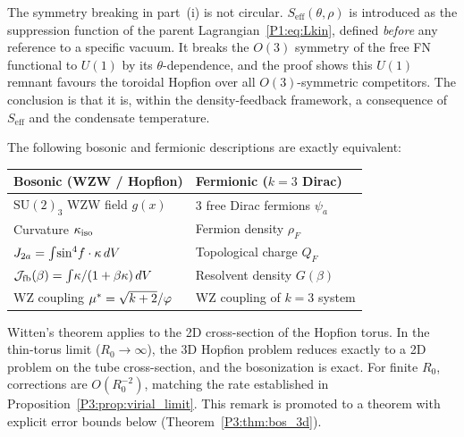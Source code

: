 \begin{remark}
\label{P1:rem:symmetry_breaking_noncircular}
The symmetry breaking in part~(i) is not circular.
$S_{\mathrm{eff}}(\theta,\rho)$ is introduced as the suppression
function of the parent Lagrangian~\eqref{P1:eq:Lkin}, defined
\emph{before} any reference to a specific vacuum.  It breaks the
$O(3)$ symmetry of the free FN functional to $U(1)$ by its $\theta$-dependence,
and the proof shows this $U(1)$ remnant favours the toroidal Hopfion
over all $O(3)$-symmetric competitors.  The conclusion is that it is, within the
density-feedback framework, a consequence of $S_{\mathrm{eff}}$
and the condensate temperature.
\end{remark}

\begin{theorem}[Witten bosonization dictionary, $k=3$]
\label{P3:thm:bosonization}
The following bosonic and fermionic descriptions are exactly equivalent:
\begin{center}
\begin{tabular}{ll}
\toprule
Bosonic (WZW / Hopfion) & Fermionic ($k=3$ Dirac) \\
\midrule
$\mathrm{SU}(2)_3$ WZW field $g(x)$ & 3 free Dirac fermions $\psi_a$ \\
Curvature $\kappa_{\mathrm{iso}}$ & Fermion density $\rho_F$ \\
$J_{2a} = \int\!\sin^4\!f\cdot\kappa\,dV$ & Topological charge $Q_F$ \\
$\mathcal{J}_{\mathrm{fb}}(\beta) = \int\!\kappa/(1+\beta\kappa)\,dV$ & Resolvent density $G(\beta)$ \\
WZ coupling $\mu^* = \sqrt{k+2}/\varphi$ & WZ coupling of $k=3$ system \\
\bottomrule
\end{tabular}
\end{center}
\end{theorem}

\begin{remark}
\label{P3:rem:3d2d_reduction}
Witten's theorem applies to the 2D cross-section of the Hopfion torus.
In the thin-torus limit ($R_0\to\infty$), the 3D Hopfion problem reduces
exactly to a 2D problem on the tube cross-section, and the bosonization
is exact.  For finite $R_0$, corrections are $O(R_0^{-2})$, matching
the rate established in Proposition~\ref{P3:prop:virial_limit}.
This remark is promoted to a theorem with explicit error bounds below
(Theorem~\ref{P3:thm:bos_3d}).
\end{remark}

